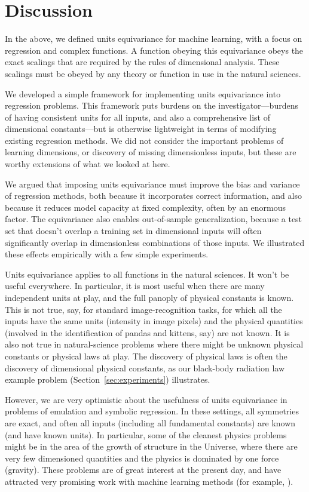 \documentclass[twoside,11pt]{article}
\newcommand{\sectionname}{Section}
\newcommand{\secref}[1]{\sectionname~\ref{#1}}
\begin{document}
\section{Discussion}

In the above, we defined units equivariance for machine learning, with a focus on regression and complex functions.
A function obeying this equivariance obeys the exact scalings that are required by the rules of dimensional analysis. These scalings must be obeyed by any theory or function in use in the natural sciences.

We developed a simple framework for implementing units equivariance into regression problems.
This framework puts burdens on the investigator---burdens of having consistent units for all inputs, and also a comprehensive list of dimensional constants---but is otherwise lightweight in terms of modifying existing regression methods.
We did not consider the important problems of learning dimensions, or discovery of missing dimensionless inputs, but these are worthy extensions of what we looked at here.

We argued that imposing units equivariance must improve the bias and variance of regression methods, both because it incorporates correct information, and also because it reduces model capacity at fixed complexity, often by an enormous factor.
The equivariance also enables out-of-sample generalization, because a test set that doesn't overlap a training set in dimensional inputs will often significantly overlap in dimensionless combinations of those inputs.
We illustrated these effects empirically with a few simple experiments.

Units equivariance applies to all functions in the natural sciences.
It won't be useful everywhere.
In particular, it is most useful when there are many independent units at play, and the full panoply of physical constants is known.
This is not true, say, for standard image-recognition tasks, for which all the inputs have the same units (intensity in image pixels) and the physical quantities (involved in the identification of pandas and kittens, say) are not known.
It is also not true in natural-science problems where there might be unknown physical constants or physical laws at play.
The discovery of physical laws is often the discovery of dimensional physical constants, as our black-body radiation law example problem (\secref{sec:experiments}) illustrates.

However, we are very optimistic about the usefulness of units equivariance in problems of emulation and symbolic regression.
In these settings, all symmetries are exact, and often all inputs (including all fundamental constants) are known (and have known units).
In particular, some of the cleanest physics problems might be in the area of the growth of structure in the Universe, where there are very few dimensioned quantities and the physics is dominated by one force (gravity).
These problems are of great interest at the present day, and have attracted very promising work with machine learning methods (for example, \citealt{he, berger, kodi, troster}).
\end{document}
